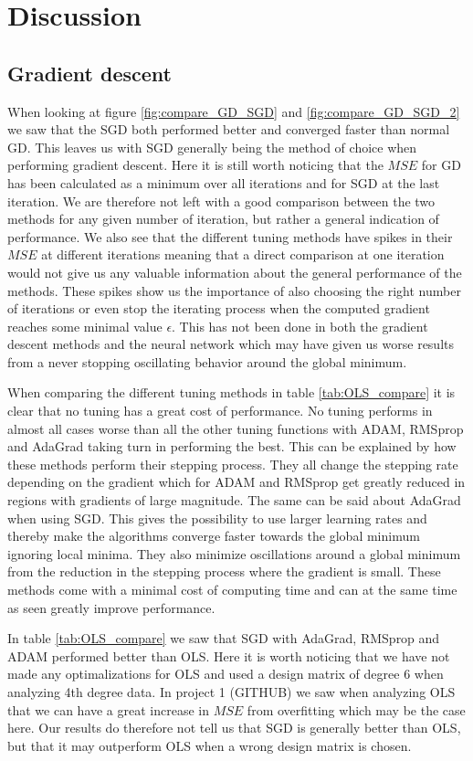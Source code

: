 \documentclass[11pt]{article}
\begin{document}
\section{Discussion}
\subsection{Gradient descent}
When looking at figure \ref{fig:compare_GD_SGD} and \ref{fig:compare_GD_SGD_2} we saw that the SGD both performed better and converged faster than normal GD. This leaves us with SGD generally being the method of choice when performing gradient descent. Here it is still worth noticing that the $MSE$ for GD has been calculated as a minimum over all iterations and for SGD at the last iteration. We are therefore not left with a good comparison between the two methods for any given number of iteration, but rather a general indication of performance.
We also see that the different tuning methods have spikes in their $MSE$ at different iterations meaning that a direct comparison at one iteration would not give us any valuable information about the general performance of the methods. These spikes show us the importance of also choosing the right number of iterations or even stop the iterating process when the computed gradient reaches some minimal value $\epsilon$. This has not been done in both the gradient descent methods and the neural network which may have given us worse results from a never stopping oscillating behavior around the global minimum.

When comparing the different tuning methods in table \ref{tab:OLS_compare} it is clear that no tuning has a great cost of performance. No tuning performs in almost all cases worse than all the other tuning functions with ADAM, RMSprop and AdaGrad taking turn in performing the best. This can be explained by how these methods perform their stepping process. They all change the stepping rate depending on the gradient which for ADAM and RMSprop get greatly reduced in regions with gradients of large magnitude. The same can be said about AdaGrad when using SGD. This gives the possibility to use larger learning rates and thereby make the algorithms converge faster towards the global minimum ignoring local minima. They also minimize oscillations around a global minimum from the reduction in the stepping process where the gradient is small.  These methods come with a minimal cost of computing time and can at the same time as seen greatly improve performance.

In table \ref{tab:OLS_compare} we saw that SGD with AdaGrad, RMSprop and ADAM performed better than OLS. Here it is worth noticing that we have not made any optimalizations for OLS and used a design matrix of degree 6 when analyzing 4th degree data. In project 1 (GITHUB) we saw when analyzing OLS that we can have a great increase in $MSE$ from overfitting which may be the case here. Our results do therefore not tell us that SGD is generally better than OLS, but that it may outperform OLS when a wrong design matrix is chosen.
\end{document}
